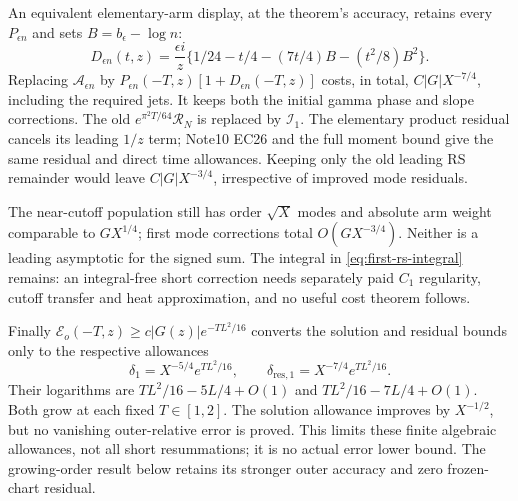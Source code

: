 \documentclass[11pt]{article}
\numberwithin{equation}{section}
\begin{document}
An equivalent elementary-arm display, at the theorem's accuracy, retains
every \(P_{\epsilon n}\) and sets \(B=b_\epsilon-\log n\):
\begin{equation}
 D_{\epsilon n}(t,z)=\frac{\epsilon i}{z}
       \{1/24-t/4-(7t/4)B-(t^2/8)B^2\}.
 \label{eq:first-elementary-correction}
\end{equation}
Replacing \(\mathcal A_{\epsilon n}\) by
\(P_{\epsilon n}(-T,z)[1+D_{\epsilon n}(-T,z)]\) costs, in total,
\(C|G|X^{-7/4}\), including the required jets. It keeps both the
initial gamma phase and slope corrections. The old
\(e^{\pi^2T/64}\mathcal R_N\) is replaced by \(\mathcal I_1\).
The elementary product residual cancels its leading \(1/z\) term;
Note10 EC26 and the full moment bound give the same residual and direct
time allowances. Keeping only the old leading RS remainder would leave
\(C|G|X^{-3/4}\), irrespective of improved mode residuals.

The near-cutoff population still has order \(\sqrt X\) modes and
absolute arm weight comparable to \(GX^{1/4}\); first mode corrections
total \(O(GX^{-3/4})\). Neither is a leading asymptotic for the signed
sum. The integral in \eqref{eq:first-rs-integral} remains: an
integral-free short correction needs separately paid \(C_1\) regularity,
cutoff transfer and heat approximation, and no useful cost theorem follows.

Finally \(\mathcal E_o(-T,z)\ge c|G(z)|e^{-TL^2/16}\) converts the
solution and residual bounds only to the respective allowances
\begin{equation}
 \delta_1=X^{-5/4}e^{TL^2/16},\qquad
 \delta_{\mathrm{res},1}=X^{-7/4}e^{TL^2/16}.
 \label{eq:first-remaining-outer-loss}
\end{equation}
Their logarithms are \(TL^2/16-5L/4+O(1)\) and
\(TL^2/16-7L/4+O(1)\). Both grow at each fixed \(T\in[1,2]\).
The solution allowance improves by \(X^{-1/2}\), but no vanishing
outer-relative error is proved. This limits these finite algebraic
allowances, not all short resummations; it is no actual error lower bound.
The growing-order result below retains its stronger outer accuracy
and zero frozen-chart residual.
\end{document}
